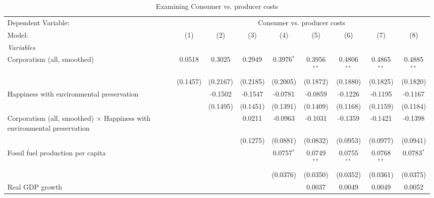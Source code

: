 
\begin{table}[htbp]
   \caption{Examining Consumer vs. producer costs}
   \centering
   \begin{tabular}{lcccccccc}
      \tabularnewline \midrule \midrule
      Dependent Variable: & \multicolumn{8}{c}{Consumer vs. producer costs}\\
      Model:                                                                          & (1)      & (2)      & (3)      & (4)          & (5)           & (6)           & (7)           & (8)\\  
      \midrule
      \emph{Variables}\\
      Corporatism (all, smoothed)                                                     & 0.0518   & 0.3025   & 0.2949   & 0.3976$^{*}$ & 0.3956$^{**}$ & 0.4806$^{**}$ & 0.4865$^{**}$ & 0.4885$^{**}$\\   
                                                                                      & (0.1457) & (0.2167) & (0.2185) & (0.2005)     & (0.1872)      & (0.1880)      & (0.1825)      & (0.1820)\\   
      Happiness with environmental preservation                                       &          & -0.1502  & -0.1547  & -0.0781      & -0.0859       & -0.1226       & -0.1195       & -0.1167\\   
                                                                                      &          & (0.1495) & (0.1451) & (0.1391)     & (0.1409)      & (0.1168)      & (0.1159)      & (0.1184)\\   
      Corporatism (all, smoothed) $\times$ Happiness with environmental preservation  &          &          & 0.0211   & -0.0963      & -0.1031       & -0.1359       & -0.1421       & -0.1398\\   
                                                                                      &          &          & (0.1275) & (0.0881)     & (0.0832)      & (0.0953)      & (0.0977)      & (0.0941)\\   
      Fossil fuel production per capita                                               &          &          &          & 0.0757$^{*}$ & 0.0749$^{**}$ & 0.0755$^{**}$ & 0.0768$^{**}$ & 0.0783$^{*}$\\   
                                                                                      &          &          &          & (0.0376)     & (0.0350)      & (0.0352)      & (0.0361)      & (0.0375)\\   
      Real GDP growth                                                                 &          &          &          &              & 0.0037        & 0.0049        & 0.0049        & 0.0052\\   

\end{tabular}
\end{table}
